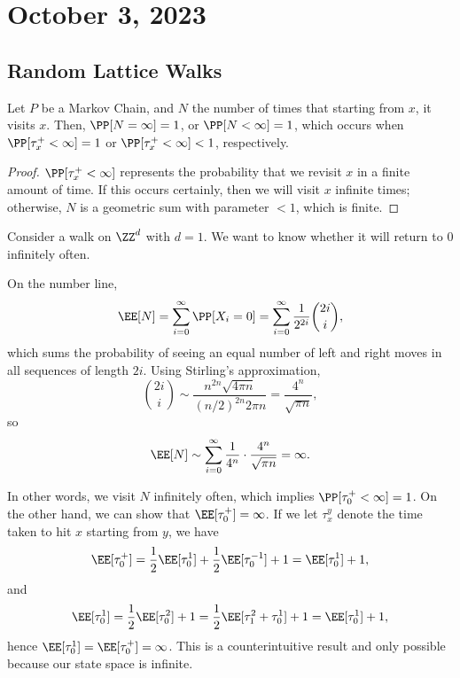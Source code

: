 \section{October 3, 2023}

\subsection{Random Lattice Walks}

\begin{theorem}
\lemlabel 

Let $P$ be a Markov Chain, and $N$ the number of times that starting from $x$, it visits $x$. Then, $\PP[N = \infty] = 1$, or $\PP[N < \infty] = 1$, which occurs when $\PP[\tau_x^+ < \infty] = 1$ or $\PP[\tau_x^+ < \infty] < 1$, respectively.
\end{theorem}

\begin{proof}
$\PP[\tau_x^+ < \infty]$ represents the probability that we revisit $x$ in a finite amount of time. If this occurs certainly, then we will visit $x$ infinite times; otherwise, $N$ is a geometric sum with parameter $<1$, which is finite. 
\end{proof}

\begin{example}
\exlabel

Consider a walk on $\ZZ^d$ with $d=1$. We want to know whether it will return to $0$ infinitely often. 
\end{example}

On the number line,
\[\EE[N] = \sum_{i=0}^{\infty}\PP[X_i=0] = \sum_{i=0}^{\infty}\frac{1}{2^{2i}}\binom{2i}{i},\]
which sums the probability of seeing an equal number of left and right moves in all sequences of length $2i$. Using Stirling's approximation, 
\[\binom{2i}{i}\sim \frac{n^{2n}\sqrt{4\pi n}}{(n/2)^{2n}2\pi n} = \frac{4^n}{\sqrt{\pi n}},\]
so 
\[\EE[N] \sim \sum_{i=0}^{\infty}\frac{1}{4^n}\cdot \frac{4^n}{\sqrt{\pi n}} = \infty.\]

In other words, we visit $N$ infinitely often, which implies $\PP[\tau_0^+ < \infty] = 1$. On the other hand, we can show that $\EE[\tau_0^+]=\infty$. If we let $\tau_x^{y}$ denote the time taken to hit $x$ starting from $y$, we have 
\[\EE[\tau_0^+] = \frac{1}{2}\EE[\tau_0^{1}] + \frac{1}{2}\EE[\tau_0^{-1}] + 1 = \EE[\tau_0^{1}] + 1,\]
and 
\[\EE[\tau_0^1] = \frac{1}{2}\EE[\tau_0^2] + 1 = \frac{1}{2}\EE[\tau_1^2 + \tau_0^1] + 1 = \EE[\tau_0^1] + 1,\]
hence $\EE[\tau_0^1] = \EE[\tau_0^+] = \infty$. This is a counterintuitive result and only possible because our state space is infinite. 

